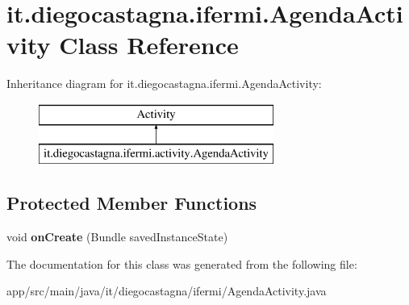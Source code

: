 \hypertarget{classit_1_1diegocastagna_1_1ifermi_1_1_agenda_activity}{}\section{it.\+diegocastagna.\+ifermi.\+Agenda\+Activity Class Reference}
\label{classit_1_1diegocastagna_1_1ifermi_1_1_agenda_activity}
Inheritance diagram for it.\+diegocastagna.\+ifermi.\+Agenda\+Activity\+:\begin{figure}[H]
\begin{center}
\leavevmode
\includegraphics[height=2.000000cm]{classit_1_1diegocastagna_1_1ifermi_1_1_agenda_activity}
\end{center}
\end{figure}
\subsection*{Protected Member Functions}
\begin{DoxyCompactItemize}
\item 
\mbox{\label{classit_1_1diegocastagna_1_1ifermi_1_1_agenda_activity_a95e6fc019099ca469a87113dc41f3168}} 
void {\bfseries on\+Create} (Bundle saved\+Instance\+State)
\end{DoxyCompactItemize}


The documentation for this class was generated from the following file\+:\begin{DoxyCompactItemize}
\item 
app/src/main/java/it/diegocastagna/ifermi/Agenda\+Activity.\+java\end{DoxyCompactItemize}
